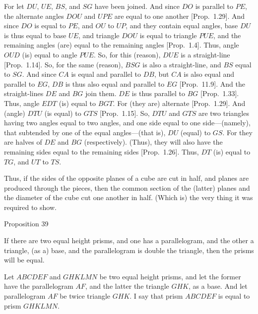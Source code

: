 For let $DU$, $UE$, $BS$, and $SG$ have been joined. And since
$DO$ is parallel to $PE$, the alternate angles $DOU$ and $UPE$
are equal to one another [Prop.~1.29].
And since $DO$ is equal to $PE$, and $OU$ to $UP$, and they contain
equal angles, base $DU$ is thus equal to base $UE$, and triangle
$DOU$ is equal to triangle $PUE$, and the remaining angles (are) equal to
the remaining angles [Prop.~1.4]. Thus,
angle $OUD$ (is) equal to angle $PUE$. So, for  this (reason),
$DUE$ is a straight-line [Prop.~1.14].
So, for the same (reason), $BSG$ is also a straight-line, and $BS$ equal to
$SG$. And since $CA$ is equal and parallel to $DB$, but
$CA$ is also equal and parallel to $EG$, $DB$ is thus also equal and parallel 
to $EG$ [Prop.~11.9]. And the straight-lines
$DE$ and $BG$ join them. $DE$ is thus parallel to $BG$ [Prop.~1.33]. Thus, angle $EDT$ (is) equal to $BGT$.
For (they are) alternate [Prop.~1.29]. And (angle)
$DTU$ (is equal) to $GTS$ [Prop.~1.15]. So, $DTU$ and $GTS$ are two triangles having
two angles equal to two angles, and one side equal to one side---(namely),
that subtended by one of the equal angles---(that is), $DU$ (equal) to
$GS$. For they are halves of $DE$ and $BG$ (respectively).
(Thus), they will also have the remaining sides equal to the remaining
sides [Prop.~1.26]. Thus, $DT$ (is) equal
to $TG$, and $UT$ to $TS$.

Thus, if the sides of the opposite planes of a cube are cut in half, and planes are produced through the pieces, then the common section of the (latter) planes and the diameter of the cube cut one another in half. (Which is) the very thing it
was required to show.~\\


\begin{center}
{\large Proposition 39}
\end{center}

If there are two equal height prisms,
and one has a parallelogram, and the other a triangle,  (as a) base, 
and the parallelogram is double the triangle, then the prisms will be equal.

\epsfysize=1.2in
\centerline{}

Let $ABCDEF$ and $GHKLMN$ be two equal height prisms, and
let the former have the parallelogram $AF$, and the latter the
triangle $GHK$, as a base. And let parallelogram $AF$ be twice
triangle $GHK$. I say that prism $ABCDEF$ is equal to prism
$GHKLMN$.

